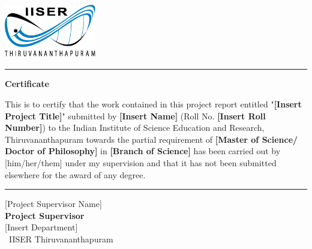 \thispagestyle{plain}


 \flushleft
 \includegraphics[width=40mm]{Images & Logos/iiser_logo.png}

\vspace{0.5\baselineskip}
\hrule
\vspace{3\baselineskip}

\begin{center}
{\Large {\bf Certificate}}
\end{center}

\vspace{\baselineskip}

\noindent This is to certify that the work contained in this project report entitled
"\textbf{[Insert Project Title]}" submitted by \textbf{[Insert Name]} (Roll No. \textbf{[Insert Roll Number]}) to the Indian Institute of Science Education and Research, Thiruvananthapuram towards the partial requirement of {\bf [Master of Science/ Doctor of Philosophy]} in \textbf{[Branch of Science]} has been carried out by [him/her/them] under my supervision and that it has not been submitted elsewhere for the award of any degree.

\vspace{3\baselineskip}
\begin{flushright}
\begin{minipage}[c]{0.45\textwidth}
\centering
\vspace{3\baselineskip}
\hrule
\vspace{1.5\baselineskip}
{\large [Project Supervisor Name]} \bigskip\\
{\large \bf Project Supervisor} \\
\large [Insert Department] ~\\\
IISER Thiruvananthapuram
\end{minipage}
\end{flushright}
\vspace{\baselineskip}
\restoregeometry

